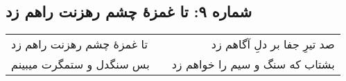 \begin{center}
\section*{شماره ۹: تا غمزۀ چشم رهزنت راهم زد}
\label{sec:009}
\begin{longtable}{l p{0.5cm} r}
تا غمزهٔ چشم رهزنت راهم زد
&&
صد تیرِ جفا بر دلِ آگاهم زد
\\
بس سنگدل و ستمگرت میبینم
&&
بشتاب که سنگ و سیم را خواهم زد
\\
\end{longtable}
\end{center}
